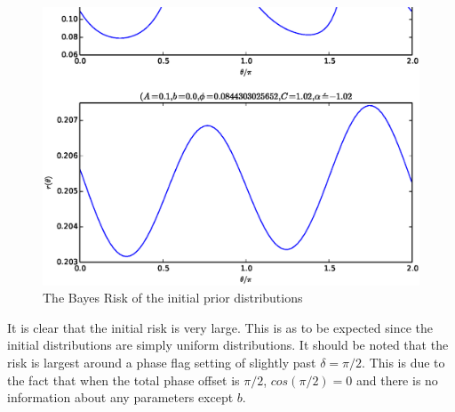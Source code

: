 \begin{figure}[ht!]
\centering
\includegraphics[scale=1.0]{Figures/risks1.eps}
\caption{The Bayes Risk of the initial prior distributions}
\label{fig:initialdistributions}
\end{figure}
It is clear that the initial risk is very large. This is as to be expected since the initial distributions are simply uniform distributions. It should be noted that the risk is largest around a phase flag setting of slightly  past $\delta=\pi/2$. This is due to the fact that when the total phase offset is $\pi/2$, $cos(\pi/2)=0$ and there is no information about any parameters except $b$. 

